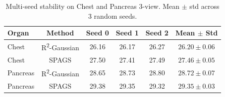 \begin{table}[t]
\centering
\caption{Multi-seed stability on Chest and Pancreas 3-view. Mean $\pm$ std across 3 random seeds.}
\label{tab:stability}
\begin{tabular}{lccccc}
\toprule
Organ & Method & Seed 0 & Seed 1 & Seed 2 & Mean $\pm$ Std \\
\midrule
 Chest & R\textsuperscript{2}-Gaussian & 26.16 & 26.17 & 26.27 & $26.20\pm0.06$ \\
 Chest & SPAGS & 27.50 & 27.41 & 27.49 & $27.46\pm0.05$ \\
\midrule
 Pancreas & R\textsuperscript{2}-Gaussian & 28.65 & 28.73 & 28.80 & $28.72\pm0.07$ \\
 Pancreas & SPAGS & 29.38 & 29.35 & 29.32 & $29.35\pm0.03$ \\
\bottomrule
\end{tabular}
\end{table}
